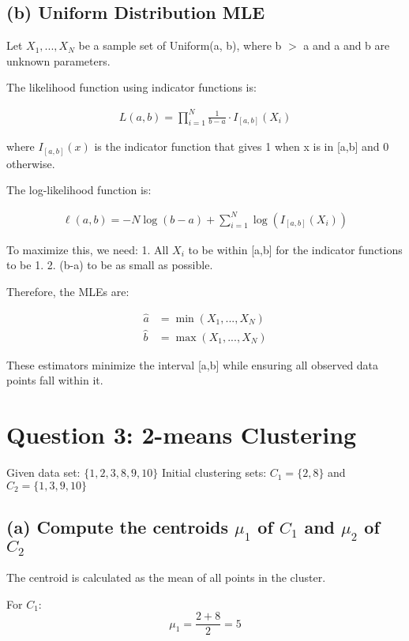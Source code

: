 \documentclass{article}
\begin{document}
\subsection*{(b) Uniform Distribution MLE}

Let $X_1, ..., X_N$ be a sample set of Uniform(a, b), where b $>$ a and a and b are unknown parameters.

The likelihood function using indicator functions is:

\begin{align*}
L(a,b) = \prod_{i=1}^N \frac{1}{b-a} \cdot I_{[a,b]}(X_i)
\end{align*}

where $I_{[a,b]}(x)$ is the indicator function that gives 1 when x is in [a,b] and 0 otherwise.

The log-likelihood function is:

\begin{align*}
\ell(a,b) = -N \log(b-a) + \sum_{i=1}^N \log(I_{[a,b]}(X_i))
\end{align*}

To maximize this, we need:
1. All $X_i$ to be within [a,b] for the indicator functions to be 1.
2. (b-a) to be as small as possible.

Therefore, the MLEs are:

\begin{align*}
\hat{a} &= \min(X_1, ..., X_N) \\
\hat{b} &= \max(X_1, ..., X_N)
\end{align*}

These estimators minimize the interval [a,b] while ensuring all observed data points fall within it.

\section*{Question 3: 2-means Clustering}

Given data set: $\{1, 2, 3, 8, 9, 10\}$
Initial clustering sets: $C_1 = \{2, 8\}$ and $C_2 = \{1, 3, 9, 10\}$

\subsection*{(a) Compute the centroids $\mu_1$ of $C_1$ and $\mu_2$ of $C_2$}

The centroid is calculated as the mean of all points in the cluster.

For $C_1$:
\[\mu_1 = \frac{2 + 8}{2} = 5\]
\end{document}

